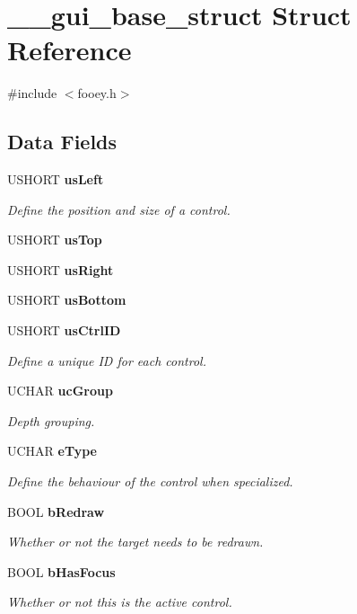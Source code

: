 \section{\_\-\_\-gui\_\-base\_\-struct Struct Reference}
\label{struct____gui__base__struct}


{\ttfamily \#include $<$fooey.h$>$}\subsection*{Data Fields}
\begin{DoxyCompactItemize}
\item 
USHORT {\bf usLeft}
\begin{DoxyCompactList}\small\item\em Define the position and size of a control. \item\end{DoxyCompactList}\item 
USHORT {\bf usTop}
\item 
USHORT {\bf usRight}
\item 
USHORT {\bf usBottom}
\item 
USHORT {\bf usCtrlID}
\begin{DoxyCompactList}\small\item\em Define a unique ID for each control. \item\end{DoxyCompactList}\item 
UCHAR {\bf ucGroup}
\begin{DoxyCompactList}\small\item\em Depth grouping. \item\end{DoxyCompactList}\item 
UCHAR {\bf eType}
\begin{DoxyCompactList}\small\item\em Define the behaviour of the control when specialized. \item\end{DoxyCompactList}\item 
BOOL {\bf bRedraw}
\begin{DoxyCompactList}\small\item\em Whether or not the target needs to be redrawn. \item\end{DoxyCompactList}\item 
BOOL {\bf bHasFocus}
\begin{DoxyCompactList}\small\item\em Whether or not this is the active control. \item\end{DoxyCompactList}\item 

\end{DoxyCompactItemize}
